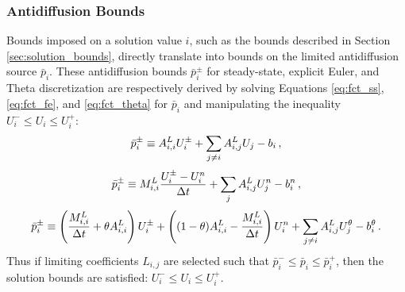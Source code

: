 

\subsubsection{Antidiffusion Bounds}

Bounds imposed on a solution value $i$, such as the bounds described in Section
\ref{sec:solution_bounds}, directly translate into bounds on the limited
antidiffusion source $\bar{p}_i$. These antidiffusion bounds $\bar{p}_i^\pm$ for steady-state,
explicit Euler, and Theta discretization are respectively derived by
solving Equations \eqref{eq:fct_ss}, \eqref{eq:fct_fe}, and \eqref{eq:fct_theta}
for $\bar{p}_i$ and manipulating the inequality $U^-_i\leq U_i\leq U^+_i$:
\begin{equation}\label{eq:antidiffusion_bounds_ss}
  \bar{p}_i^\pm \equiv A_{i,i}^L U_i^\pm
    + \sum\limits_{j\ne i} A_{i,j}^L U_j - b_i \,,
\end{equation}
\begin{equation}\label{eq:antidiffusion_bounds_fe}
  \bar{p}_i^\pm \equiv M^L_{i,i}
    \frac{U_i^\pm - U_i^n}{\Delta t}
  + \sum\limits_j A_{i,j}^L U_j^n
  - b_i^n \,,
\end{equation}
\begin{equation}\label{eq:antidiffusion_bounds_theta}
  \bar{p}_i^\pm \equiv
   \left(\frac{M^L_{i,i}}{\Delta t}+\theta A_{i,i}^L\right)
     U_i^\pm
    + \left((1-\theta) A_{i,i}^L-\frac{M^L_{i,i}}{\Delta t}\right)
     U_i^n
  +\sum\limits_{j\ne i} A_{i,j}^L U_j^\theta
  -b_i^\theta
  \,.
\end{equation}
Thus if limiting coefficients $L_{i,j}$ are selected such that
$\bar{p}_i^-\leq \bar{p}_i\leq \bar{p}_i^+$, then the solution bounds are
satisfied: $U^-_i\leq U_i\leq U^+_i$.

